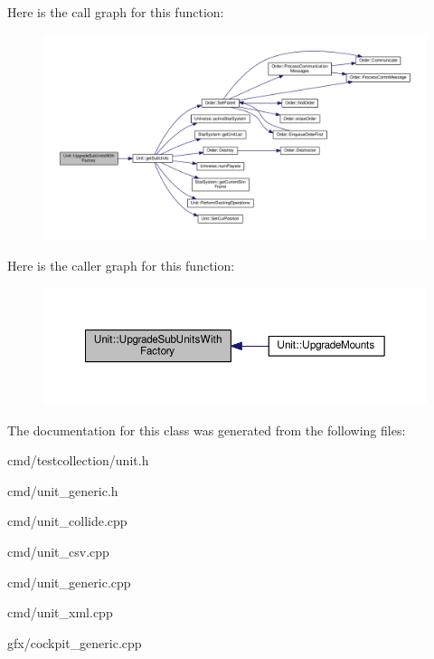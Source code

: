 Here is the call graph for this function\+:
\nopagebreak
\begin{figure}[H]
\begin{center}
\leavevmode
\includegraphics[width=350pt]{df/dd9/classUnit_aec19392b9fba96570b5e8fe8918bcfb4_cgraph}
\end{center}
\end{figure}




Here is the caller graph for this function\+:
\nopagebreak
\begin{figure}[H]
\begin{center}
\leavevmode
\includegraphics[width=350pt]{df/dd9/classUnit_aec19392b9fba96570b5e8fe8918bcfb4_icgraph}
\end{center}
\end{figure}




The documentation for this class was generated from the following files\+:\begin{DoxyCompactItemize}
\item 
cmd/testcollection/unit.\+h\item 
cmd/unit\+\_\+generic.\+h\item 
cmd/unit\+\_\+collide.\+cpp\item 
cmd/unit\+\_\+csv.\+cpp\item 
cmd/unit\+\_\+generic.\+cpp\item 
cmd/unit\+\_\+xml.\+cpp\item 
gfx/cockpit\+\_\+generic.\+cpp\end{DoxyCompactItemize}
